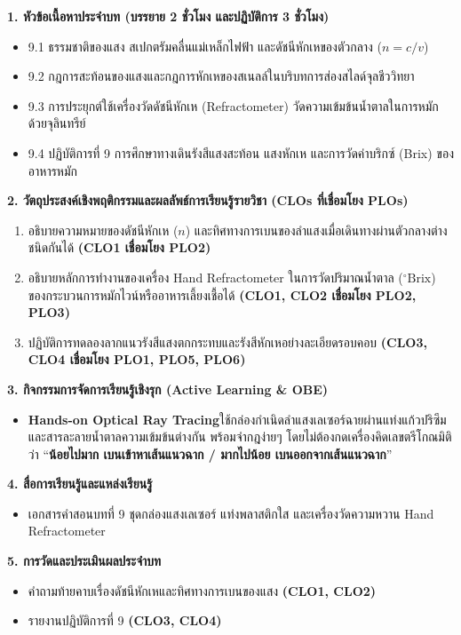\cleardoublepage
{}
\begin{planbox}
\noindent\textbf{1. หัวข้อเนื้อหาประจำบท (บรรยาย 2 ชั่วโมง และปฏิบัติการ 3 ชั่วโมง)}
\begin{itemize}
    \item 9.1 ธรรมชาติของแสง สเปกตรัมคลื่นแม่เหล็กไฟฟ้า และดัชนีหักเหของตัวกลาง ($n = c/v$)
    \item 9.2 กฎการสะท้อนของแสงและกฎการหักเหของสเนลล์ในบริบทการส่องสไลด์จุลชีววิทยา
    \item 9.3 การประยุกต์ใช้เครื่องวัดดัชนีหักเห (Refractometer) วัดความเข้มข้นน้ำตาลในการหมักด้วยจุลินทรีย์
    \item 9.4 ปฏิบัติการที่ 9 การศึกษาทางเดินรังสีแสงสะท้อน แสงหักเห และการวัดค่าบริกซ์ (Brix) ของอาหารหมัก
\end{itemize}

\noindent\textbf{2. วัตถุประสงค์เชิงพฤติกรรมและผลลัพธ์การเรียนรู้รายวิชา (CLOs ที่เชื่อมโยง PLOs)}
\begin{enumerate}
    \item อธิบายความหมายของดัชนีหักเห ($n$) และทิศทางการเบนของลำแสงเมื่อเดินทางผ่านตัวกลางต่างชนิดกันได้ \textbf{(CLO1 เชื่อมโยง PLO2)}
    \item อธิบายหลักการทำงานของเครื่อง Hand Refractometer ในการวัดปริมาณน้ำตาล ($^\circ\text{Brix}$) ของกระบวนการหมักไวน์หรืออาหารเลี้ยงเชื้อได้ \textbf{(CLO1, CLO2 เชื่อมโยง PLO2, PLO3)}
    \item ปฏิบัติการทดลองลากแนวรังสีแสงตกกระทบและรังสีหักเหอย่างละเอียดรอบคอบ \textbf{(CLO3, CLO4 เชื่อมโยง PLO1, PLO5, PLO6)}
\end{enumerate}

\noindent\textbf{3. กิจกรรมการจัดการเรียนรู้เชิงรุก (Active Learning \& OBE)}
\begin{itemize}
    \item \textbf{Hands-on Optical Ray Tracing}\quad ใช้กล่องกำเนิดลำแสงเลเซอร์ฉายผ่านแท่งแก้วปริซึมและสารละลายน้ำตาลความเข้มข้นต่างกัน พร้อมจำกฎง่ายๆ โดยไม่ต้องกดเครื่องคิดเลขตรีโกณมิติว่า ``\textbf{น้อยไปมาก เบนเข้าหาเส้นแนวฉาก / มากไปน้อย เบนออกจากเส้นแนวฉาก}''
\end{itemize}

\noindent\textbf{4. สื่อการเรียนรู้และแหล่งเรียนรู้}
\begin{itemize}
    \item เอกสารคำสอนบทที่ 9 ชุดกล่องแสงเลเซอร์ แท่งพลาสติกใส และเครื่องวัดความหวาน Hand Refractometer
\end{itemize}

\noindent\textbf{5. การวัดและประเมินผลประจำบท}
\begin{itemize}
    \item คำถามท้ายคาบเรื่องดัชนีหักเหและทิศทางการเบนของแสง \textbf{(CLO1, CLO2)}
    \item รายงานปฏิบัติการที่ 9 \textbf{(CLO3, CLO4)}
\end{itemize}
\end{planbox}
\clearpage

